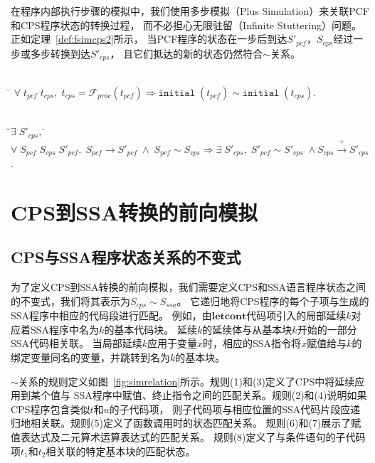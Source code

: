 在程序内部执行步骤的模拟中，我们使用多步模拟（Plus Simulation）来关联PCF和CPS程序状态的转换过程，
而不必担心无限驻留（Infinite Stuttering）问题。正如定理~\ref{def:fsimcps2}所示，
当PCF程序的状态在一步后到达$S'_{pcf}$，$S_{cps}$经过一步或多步转换到达$S'_{cps}$，
且它们抵达的新的状态仍然符合$\sim$关系。

\begin{theorem}[CPS转换中初始状态的模拟]\label{def:fsimcps}
    \begin{tabbing}
      \\
    \quad\=\kill 
    \>$\forall\; t_{pcf} \; t_{cps},\;
       t_{cps}=\mathcal{F}_{proc}(t_{pcf})\Longrightarrow \mathtt{initial}\; (t_{pcf})
       \sim \mathtt{initial}\; (t_{cps}).$
    \end{tabbing}
\end{theorem}

\begin{theorem}[CPS转换中程序内部执行步骤的模拟]\label{def:fsimcps2}
    \begin{tabbing}
      \\
    \quad\=\qquad\=$\exists\; S'_{cps},\; $\=\kill
    \>$\forall \; S_{pcf}\; S_{cps}\; S'_{pcf},\; S_{pcf}\rightarrow S'_{pcf}\; \wedge \; S_{pcf}\sim S_{cps} \Longrightarrow \exists\; S'_{cps},\; S'_{pcf}\sim S'_{cps}\; \wedge
        S_{cps}\xrightarrow{+} S'_{cps}$.
    \end{tabbing}
\end{theorem}

\section{CPS到SSA转换的前向模拟} \label{sec:cpsssaforward}

\subsection{CPS与SSA程序状态关系的不变式}

为了定义CPS到SSA转换的前向模拟，我们需要定义CPS和SSA语言程序状态之间的不变式，我们将其表示为$S_{cps} \sim S_{ssa}$。
它递归地将CPS程序的每个子项与生成的SSA程序中相应的代码段进行匹配。
例如，由$\mathbf{letcont}$代码项引入的局部延续$k$对应着SSA程序中名为$k$的基本代码块。
延续$k$的延续体与从基本块$k$开始的一部分SSA代码相关联。
当局部延续$k$应用于变量$x$时，相应的SSA指令将$x$赋值给与$k$的绑定变量同名的变量，并跳转到名为$k$的基本块。

$\sim$关系的规则定义如图~\ref{fig:simrelation}所示。规则(1)和(3)定义了CPS中将延续应用到某个值与
SSA程序中赋值、终止指令之间的匹配关系。规则(2)和(4)说明如果CPS程序包含类似$t$和$u$的子代码项，
则子代码项与相应位置的SSA代码片段应递归地相关联。规则(5)定义了函数调用时的状态匹配关系。
规则(6)和(7)展示了赋值表达式及二元算术运算表达式的匹配关系。
规则(8)定义了与条件语句的子代码项$t_1$和$t_2$相关联的特定基本块的匹配状态。

